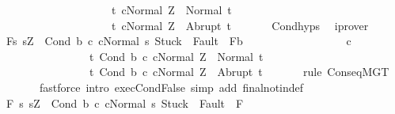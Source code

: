 \begin{isabellebody}
\ \ \ \ \ \ \ \ \ \ \ \ \ \ \ \ \ \ \ \ {\isacharbraceleft}t{\isachardot}\ {\isasymGamma}{\isasymturnstile}{\isasymlangle}c{}{\isacharcomma}Normal\ Z{\isasymrangle}\ {\isasymRightarrow}\ Normal\ t{\isacharbraceright}{\isacharcomma}\isanewline
\ \ \ \ \ \ \ \ \ \ \ \ \ \ \ \ \ \ \ \ {\isacharbraceleft}t{\isachardot}\ {\isasymGamma}{\isasymturnstile}{\isasymlangle}c{}{\isacharcomma}Normal\ Z{\isasymrangle}\ {\isasymRightarrow}\ Abrupt\ t{\isacharbraceright}{\isachardoublequoteclose}\ \isanewline
\ \ \ \ \isamarkupfalse%
\ Cond{\isachardot}hyps\ \isamarkupfalse%
\ iprover\ \ \isanewline
\ \ \isamarkupfalse%
\ {\isachardoublequoteopen}{\isasymGamma}{\isacharcomma}{\isasymTheta}{\isasymturnstile}\isactrlbsub {\isacharslash}F\isactrlesub {\isacharparenleft}{\isacharbraceleft}s{\isachardot}\ s{\isacharequal}Z\ {\isasymand}\ {\isasymGamma}{\isasymturnstile}{\isasymlangle}Cond\ b\ c{}\ c{}{\isacharcomma}Normal\ s{\isasymrangle}\ {\isasymRightarrow}{\isasymnotin}{\isacharparenleft}{\isacharbraceleft}Stuck{\isacharbraceright}\ {\isasymunion}\ Fault\ {\isacharbackquote}\ {\isacharparenleft}{\isacharminus}F{\isacharparenright}{\isacharparenright}{\isacharbraceright}{\isasyminter}{\isacharminus}b{\isacharparenright}\isanewline
\ \ \ \ \ \ \ \ \ \ \ \ \ \ \ \ \ \ c{}\ \isanewline
\ \ \ \ \ \ \ \ \ \ \ \ \ \ \ \ {\isacharbraceleft}t{\isachardot}\ {\isasymGamma}{\isasymturnstile}{\isasymlangle}Cond\ b\ c{}\ c{}{\isacharcomma}Normal\ Z{\isasymrangle}\ {\isasymRightarrow}\ Normal\ t{\isacharbraceright}{\isacharcomma}\isanewline
\ \ \ \ \ \ \ \ \ \ \ \ \ \ \ \ {\isacharbraceleft}t{\isachardot}\ {\isasymGamma}{\isasymturnstile}{\isasymlangle}Cond\ b\ c{}\ c{}{\isacharcomma}Normal\ Z{\isasymrangle}\ {\isasymRightarrow}\ Abrupt\ t{\isacharbraceright}{\isachardoublequoteclose}\ \isanewline
\ \ \ \ \isamarkupfalse%
\ {\isacharparenleft}rule\ ConseqMGT{\isacharparenright}\isanewline
\ \ \ \ \ \ \ {\isacharparenleft}fastforce\ intro{\isacharcolon}\ exec{\isachardot}CondFalse\ simp\ add{\isacharcolon}\ final{\isacharunderscore}notin{\isacharunderscore}def{\isacharparenright}\isanewline
\ \ \isamarkupfalse%
\isanewline
\ \ \isamarkupfalse%
\ {\isachardoublequoteopen}{\isasymGamma}{\isacharcomma}{\isasymTheta}{\isasymturnstile}\isactrlbsub {\isacharslash}F\isactrlesub \ {\isacharbraceleft}s{\isachardot}\ s{\isacharequal}Z\ {\isasymand}\ {\isasymGamma}{\isasymturnstile}{\isasymlangle}Cond\ b\ c{}\ c{}{\isacharcomma}Normal\ s{\isasymrangle}\ {\isasymRightarrow}{\isasymnotin}{\isacharparenleft}{\isacharbraceleft}Stuck{\isacharbraceright}\ {\isasymunion}\ Fault\ {\isacharbackquote}\ {\isacharparenleft}{\isacharminus}F{\isacharparenright}{\isacharparenright}{\isacharbraceright}\ \isanewline

\end{isabellebody}
